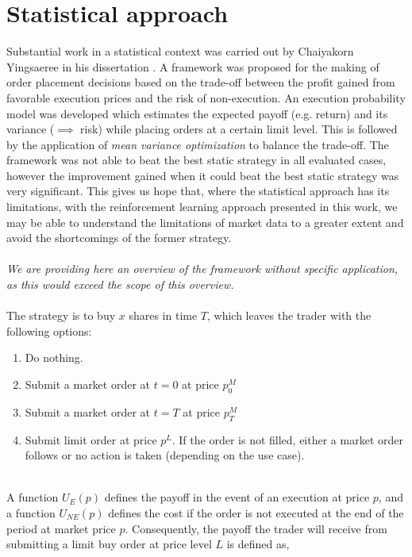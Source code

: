 \section{Statistical approach}

Substantial work in a statistical context was carried out by Chaiyakorn Yingsaeree in his dissertation \cite{yingsaeree2012algorithmic}.
A framework was proposed for the making of order placement decisions based on the trade-off between the profit gained from favorable execution prices and the risk of non-execution.
An execution probability model was developed which estimates the expected payoff (e.g. return) and its variance ($\implies$ risk) while placing orders at a certain limit level.  This is followed by the application of \textit{mean variance optimization} to balance the trade-off.
The framework was not able to beat the best static strategy in all evaluated cases, however the improvement gained when it could beat the best static strategy was very significant.
This gives us hope that, where the statistical approach has its limitations, with the reinforcement learning approach presented in this work, we may be able to understand the limitations of market data to a greater extent and avoid the shortcomings of the former strategy.
\\
\\
\textit{We are providing here an overview of the framework without specific application, as this would exceed the scope of this overview.}
\\
\\
The strategy is to buy $x$ shares in time $T$, which leaves the trader with the following options:
\begin{enumerate}
    \item Do nothing.
    \item Submit a market order at $t=0$ at price $p_{0}^M$
    \item Submit a market order at $t=T$ at price $p_{T}^M$
    \item Submit limit order at price $p^L$. If the order is not filled, either a market order follows or no action is taken (depending on the use case).
\end{enumerate}
\hfill
\\
A function $U_{E}(p)$ defines the payoff in the event of an execution at price $p$, and a function $U_{NE}(p)$ defines the cost if the order is not executed at the end of the period at market price $p$. 
Consequently, the payoff the trader will receive from submitting a limit buy order at price level $L$ is defined as,
